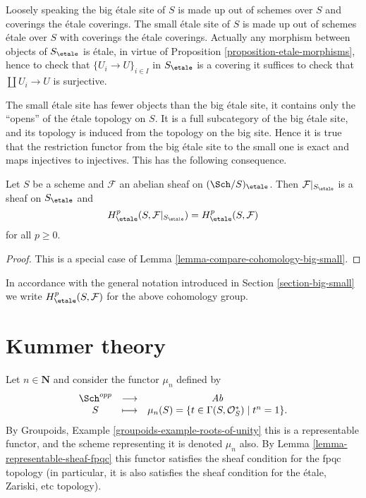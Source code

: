 \noindent
Loosely speaking the big \'etale site of $S$ is made up out of schemes over $S$
and coverings the \'etale coverings. The small \'etale site of $S$ is made up
out of schemes \'etale over $S$ with coverings the \'etale coverings.
Actually any morphism between objects of $S_\etale$ is \'etale, in
virtue of
Proposition \ref{proposition-etale-morphisms},
hence to check that $\{U_i \to U\}_{i \in I}$ in $S_\etale$
is a covering it suffices to check that $\coprod U_i \to U$ is surjective.

\medskip\noindent
The small \'etale site has fewer objects than the big \'etale site, it
contains only the ``opens'' of the \'etale topology on $S$. It is a full
subcategory of the big \'etale site, and its topology is induced from the
topology on the big site. Hence it is true that the restriction functor
from the big \'etale site to the small one is exact and maps injectives to
injectives. This has the following consequence.

\begin{proposition}
\label{proposition-cohomology-restrict-small-site}
Let $S$ be a scheme and $\mathcal{F}$ an abelian sheaf on
$(\Sch/S)_\etale$.
Then $\mathcal{F}|_{S_\etale}$ is a sheaf on $S_\etale$ and
$$
H^p_\etale(S, \mathcal{F}|_{S_\etale}) =
H^p_\etale(S, \mathcal{F})
$$
for all $p \geq 0$.
\end{proposition}

\begin{proof}
This is a special case of Lemma \ref{lemma-compare-cohomology-big-small}.
\end{proof}

\noindent
In accordance with the general notation introduced in
Section \ref{section-big-small}
we write $H_\etale^p(S, \mathcal{F})$ for the above cohomology group.





\section{Kummer theory}
\label{section-kummer}

\noindent
Let $n \in \mathbf{N}$ and consider the functor $\mu_n$ defined by
$$
\begin{matrix}
\Sch^{opp} & \longrightarrow & \textit{Ab} \\
S & \longmapsto &
\mu_n(S)
=
\{t \in \Gamma(S, \mathcal{O}_S^*) \mid t^n = 1 \}.
\end{matrix}
$$
By
Groupoids, Example \ref{groupoids-example-roots-of-unity}
this is a representable functor, and the scheme representing it
is denoted $\mu_n$ also. By
Lemma \ref{lemma-representable-sheaf-fpqc}
this functor satisfies the sheaf condition for the fpqc topology
(in particular, it is also satisfies the sheaf condition for the
\'etale, Zariski, etc topology).

